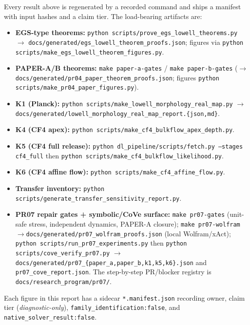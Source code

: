 \documentclass[11pt,a4paper]{article}
\theoremstyle{plain}
\theoremstyle{definition}
\begin{document}
Every result above is regenerated by a recorded command and ships a
manifest with input hashes and a claim tier. The load-bearing
artifacts are:
\begin{itemize}[leftmargin=1.4em,itemsep=2pt]
  \item \textbf{EGS-type theorems:}
        \texttt{python scripts/prove\_egs\_lowell\_theorems.py}
        $\to$ \texttt{docs/generated/egs\_lowell\_theorem\_proofs.json};
        figures via
        \texttt{python scripts/make\_egs\_lowell\_theorem\_figures.py}.
  \item \textbf{PAPER-A/B theorems:}
        \texttt{make paper-a-gates} / \texttt{make paper-b-gates}
        ($\to$ \texttt{docs/generated/pr04\_paper\_theorem\_proofs.json};
        figures \texttt{python scripts/make\_pr04\_paper\_figures.py}).
  \item \textbf{K1 (Planck):}
        \texttt{python scripts/make\_lowell\_morphology\_real\_map.py}
        $\to$ \texttt{docs/generated/lowell\_morphology\_real\_map\_report.\{json,md\}}.
  \item \textbf{K4 (CF4 apex):}
        \texttt{python scripts/make\_cf4\_bulkflow\_apex\_depth.py}.
  \item \textbf{K5 (CF4 full release):}
        \texttt{python dl\_pipeline/scripts/fetch.py --stages cf4\_full}
        then \texttt{python scripts/make\_cf4\_bulkflow\_likelihood.py}.
  \item \textbf{K6 (CF4 affine flow):}
        \texttt{python scripts/make\_cf4\_affine\_flow.py}.
  \item \textbf{Transfer inventory:}
        \texttt{python scripts/generate\_transfer\_sensitivity\_report.py}.
  \item \textbf{PR07 repair gates + symbolic/CoVe surface:}
        \texttt{make pr07-gates} (unit-safe stress, independent dynamics,
        PAPER-A closure); \texttt{make pr07-wolfram}
        $\to$\texttt{docs/generated/pr07\_wolfram\_proofs.json} (local
        Wolfram/xAct); \texttt{python scripts/run\_pr07\_experiments.py}
        then \texttt{python scripts/cove\_verify\_pr07.py}
        $\to$\texttt{docs/generated/pr07\_\{paper\_a,paper\_b,k1,k5,k6\}.json}
        and \texttt{pr07\_cove\_report.json}. The step-by-step PR/blocker
        registry is \texttt{docs/research\_program/pr07/}.
\end{itemize}
Each figure in this report has a sidecar
\texttt{*.manifest.json} recording owner, claim tier (\emph{diagnostic-only}),
\texttt{family\_identification:false}, and
\texttt{native\_solver\_result:false}.
\end{document}
